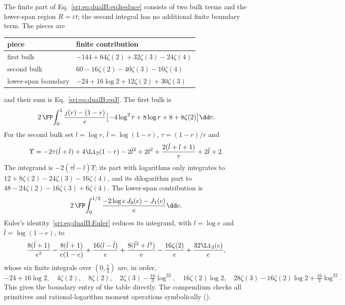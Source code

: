 The finite part of Eq.~\eqref{sri:eq:dualB:ep3reduce} consists of two bulk terms and the lower-span region
$R=\varepsilon t$; the second integral has no additional finite boundary term. The pieces are
\begin{center}\small
\begin{tabular}{@{}ll@{}}
\toprule
piece & finite contribution\\
\midrule
first bulk & $-144+64\zeta(2)+32\zeta(3)-24\zeta(4)$\\
second bulk & $60-16\zeta(2)-40\zeta(3)-10\zeta(4)$\\
lower-span boundary & $-24+16\log2+12\zeta(2)+30\zeta(3)$\\
\bottomrule
\end{tabular}
\end{center}
and their sum is Eq.~\eqref{sri:eq:dualB:ep3}. The first bulk is
\begin{equation}
 2\,\FP\!\int_0^1\frac{j(r)-(1-r)}{r}\bigl[-4\log^2r+8\log r+8+8\zeta(2)\bigr]\dd r.
\end{equation}
For the second bulk set $l=\log r$, $\bar l=\log(1-r)$, $\tau=(1-r)/r$ and
\begin{equation}
 \Upsilon=-2\tau(\bar l+l)+4\Li_2(1-r)-2\bar l^2+2l^2+\frac{2(\bar l+l+1)}{\tau}+2\bar l+2.
\end{equation}
The integrand is $-2(\tau\bar l-l)\Upsilon$; its part with logarithms only integrates to
$12+8\zeta(2)-24\zeta(3)-16\zeta(4)$, and its dilogarithm part to $48-24\zeta(2)-16\zeta(3)+6\zeta(4)$. The
lower-span contribution is
\begin{equation}
 2\,\FP\!\int_0^{1/2}\frac{-2\log e\,J_0(e)-J_1(e)}{e}\dd e.
\end{equation}
Euler's identity~\eqref{sri:eq:dualB:Euler} reduces its integrand, with $l=\log e$ and $\bar l=\log(1-e)$, to
\begin{equation}
 \frac{8(\bar l+1)}{e^2}-\frac{8(\bar l+1)}{e(1-e)}+\frac{16(l-\bar l)}{e}+\frac{8(\bar l^2+l^2)}{e}
 -\frac{16\zeta(2)}{e}+\frac{32\Li_2(e)}{e},
\end{equation}
whose six finite integrals over $(0,\frac12)$ are, in order,
\begin{equation}
 -24+16\log2,\quad 4\zeta(2),\quad 8\zeta(2),\quad 2\zeta(3)-\tfrac{16}{3}\log^32,\quad 16\zeta(2)\log2,\quad
 28\zeta(3)-16\zeta(2)\log2+\tfrac{16}{3}\log^32.
\end{equation}
This gives the boundary entry of the table directly. The compendium checks all primitives and rational-logarithm
moment operations symbolically ().

